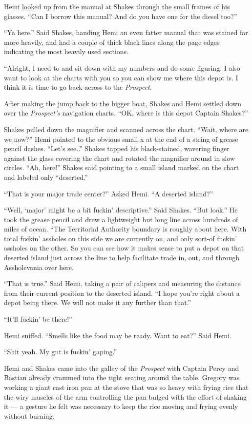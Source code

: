 \documentclass[
]{scrbook}
\begin{document}
Hemi looked up from the manual at Shakes through the small frames of his
glasses. ``Can I borrow this manual? And do you have one for the diesel
too?''

``Ya here.'' Said Shakes, handing Hemi an even fatter manual that was
stained far more heavily, and had a couple of thick black lines along
the page edges indicating the most heavily used sections.

``Alright, I need to and sit down with my numbers and do some figuring.
I also want to look at the charts with you so you can show me where this
depot is. I think it is time to go back across to the \emph{Prospect}.

After making the jump back to the bigger boat, Shakes and Hemi settled
down over the \emph{Prospect's} navigation charts. ``OK, where is this
depot Captain Shakes?''

Shakes pulled down the magnifier and scanned across the chart. ``Wait,
where are we now?'' Hemi pointed to the obvious small x at the end of a
string of grease pencil dashes. ``Let's see..'' Shakes tapped his
black-stained, wavering finger against the glass covering the chart and
rotated the magnifier around in slow circles. ``Ah, here!'' Shakes said
pointing to a small island marked on the chart and labeled only
``deserted.''

``That is your major trade center?'' Asked Hemi. ``A deserted island?''

``Well, `major' might be a bit fuckin' descriptive.'' Said Shakes. ``But
look.'' He took the grease pencil and drew a lightweight but long line
across hundreds of miles of ocean. ``The Territorial Authority boundary
is roughly about here. With total fuckin' assholes on this side we are
currently on, and only sort-of fuckin' assholes on the other. So you can
see how it makes sense to put a depot on that deserted island just
across the line to help facilitate trade in, out, and through
Assholevania over here.

``That is true.'' Said Hemi, taking a pair of calipers and measuring the
distance from their current position to the deserted island. ``I hope
you're right about a depot being there. We will not make it any further
than that.''

``It'll fuckin' be there!''

Hemi sniffed. ``Smells like the food may be ready. Want to eat?'' Said
Hemi.

``Shit yeah. My gut is fuckin' gaping.''

Hemi and Shakes came into the galley of the \emph{Prospect} with Captain
Percy and Bastian already crammed into the tight seating around the
table. Gregory was working a giant cast iron pan at the stove that was
so heavy with frying rice that the wiry muscles of the arm controlling
the pan bulged with the effort of shaking it --- a gesture he felt was
necessary to keep the rice moving and frying evenly without burning.
\end{document}
